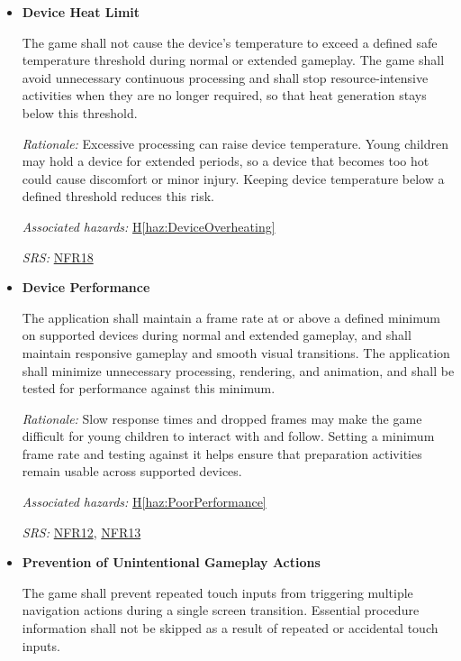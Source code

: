 \documentclass{article}
\newcounter{hazard}
\newcommand{\hazref}[1]{\hyperref[haz:#1]{H\ref*{haz:#1}}}
\newcounter{sr}
\newcommand{\srdef}[1]{\refstepcounter{sr}\label{sr:#1}\textbf{SR-\thesr:}}
\newcommand{\srsurl}{https://team-hindsight.github.io/ophthamology-game/SRS-IEEE/SRS.pdf}
\newcommand{\srsnfrref}[2]{\href{\srsurl\#nameddest=#1}{NFR#2}}
\begin{document}
\begin{itemize}[leftmargin=1.5cm, labelwidth=1.3cm, labelsep=0.2cm,
  align=left, itemsep=1.2em, parsep=0.6em]

\item[\srdef{DeviceResourceUse}]
\textbf{Device Heat Limit}

The game shall not cause the device's temperature to exceed
a defined safe temperature threshold during normal or extended
gameplay. The game shall avoid unnecessary continuous
processing and shall stop resource-intensive activities when
they are no longer required, so that heat generation stays
below this threshold.

\textit{Rationale:}
Excessive processing can raise device temperature. Young
children may hold a device for extended periods, so a device
that becomes too hot could cause discomfort or minor injury.
Keeping device temperature below a defined threshold reduces
this risk.

\textit{Associated hazards:}
\hazref{DeviceOverheating}

\textit{SRS:} \srsnfrref{NFR_DeviceHeat}{18}

\item[\srdef{DevicePerformance}]
\textbf{Device Performance}

The application shall maintain a frame rate at or above a
defined minimum on supported devices during normal and
extended gameplay, and shall maintain responsive gameplay
and smooth visual transitions. The application shall minimize
unnecessary processing, rendering, and animation, and shall be
tested for performance against this minimum.

\textit{Rationale:}
Slow response times and dropped frames may make the game
difficult for young children to interact with and follow.
Setting a minimum frame rate and testing against it helps
ensure that preparation activities remain usable across
supported devices.

\textit{Associated hazards:}
\hazref{PoorPerformance}

\textit{SRS:} \srsnfrref{NFR_Responsiveness}{12}, \srsnfrref{NFR_Smoothness}{13}

\item[\srdef{PreventAccidentalInput}]
\textbf{Prevention of Unintentional Gameplay Actions}

The game shall prevent repeated touch inputs from
triggering multiple navigation actions during a
single screen transition. Essential procedure
information shall not be skipped as a result
of repeated or accidental touch inputs.


\end{itemize}
\end{document}
